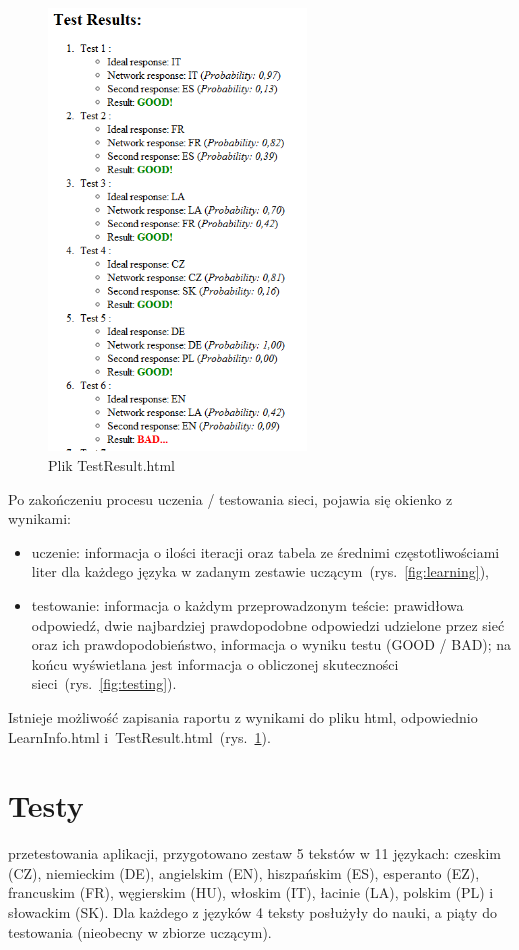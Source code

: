 \documentclass[journal]{IEEEtran}
\begin{document}
\begin{figure}[!t]
\centering
\includegraphics[width=2.7in]{TestResults}
\caption{Plik TestResult.html}
\label{fig:testing_file}
\end{figure}

Po zakończeniu procesu uczenia / testowania sieci, pojawia się okienko z wynikami:
\begin{itemize}
 \item uczenie: informacja o ilości iteracji oraz tabela ze średnimi częstotliwościami liter dla każdego języka
w zadanym zestawie uczącym~(rys.~\ref{fig:learning}),
 \item testowanie: informacja o każdym przeprowadzonym teście: prawidłowa odpowiedź, dwie najbardziej prawdopodobne odpowiedzi
udzielone przez sieć oraz ich prawdopodobieństwo, informacja o wyniku testu (GOOD / BAD); na końcu wyświetlana jest informacja
o obliczonej skuteczności sieci~(rys.~\ref{fig:testing}).
\end{itemize}
Istnieje możliwość zapisania raportu z wynikami do pliku html, odpowiednio LearnInfo.html
i~TestResult.html~(rys.~\ref{fig:testing_file}).


\section{Testy}
 przetestowania aplikacji, przygotowano zestaw 5 tekstów w 11 językach: 
czeskim (CZ), niemieckim (DE), angielskim (EN), hiszpańskim (ES), esperanto (EZ), francuskim (FR),
węgierskim (HU), włoskim (IT), łacinie (LA), polskim (PL) i słowackim (SK). Dla każdego z języków 4 teksty posłużyły
do nauki, a piąty do testowania (nieobecny w zbiorze uczącym).
\end{document}
